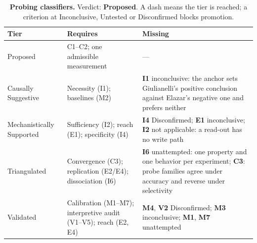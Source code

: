 \begin{table}[H]
\centering
\footnotesize
\caption{\textbf{Probing classifiers.} Verdict: \textbf{Proposed}. A dash means the tier is reached; a criterion at
Inconclusive, Untested or Disconfirmed blocks promotion.}
\label{tab:probing-verdict}
\renewcommand{\arraystretch}{1.18}
\begin{tabular}{@{}l>{\raggedright\arraybackslash}p{3.6cm}>{\raggedright\arraybackslash}p{4.4cm}@{}}
\toprule
\textbf{Tier} & \textbf{Requires} & \textbf{Missing} \\
\midrule
Proposed & C1--C2; one admissible measurement & --- \\
\addlinespace[2pt]
Causally Suggestive & Necessity (I1); baselines (M2) & \textbf{I1} inconclusive: the anchor sets Giulianelli's positive conclusion against Elazar's negative one and prefers neither \\
\addlinespace[2pt]
Mechanistically Supported & Sufficiency (I2); reach (E1); specificity (I4) & \textbf{I4} Disconfirmed; \textbf{E1} inconclusive; \textbf{I2} not applicable: a read-out has no write path \\
\addlinespace[2pt]
Triangulated & Convergence (C3); replication (E2/E4); dissociation (I6) & \textbf{I6} unattempted: one property and one behavior per experiment; \textbf{C3}: probe families agree under accuracy and reverse under selectivity \\
\addlinespace[2pt]
Validated & Calibration (M1--M7); interpretive audit (V1--V5); reach (E2, E4) & \textbf{M4}, \textbf{V2} Disconfirmed; \textbf{M3} inconclusive; \textbf{M1}, \textbf{M7} unattempted \\
\bottomrule
\end{tabular}
\end{table}
